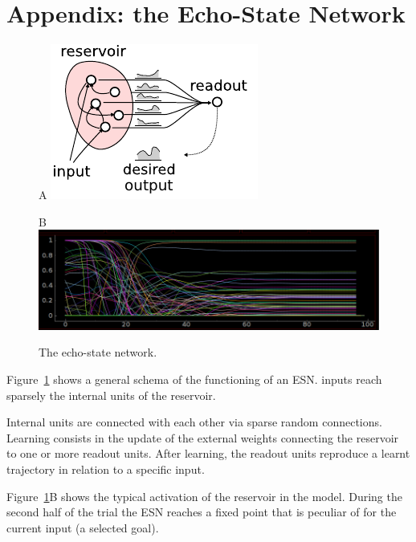 \documentclass[11pt]{article}
\begin{document}
\section{Appendix: the Echo-State Network}
%
\begin{figure}[H] 
 
    \centering 

    A \includegraphics[width=.6\textwidth]{reservoir} 
    
    B \includegraphics[width=.6\textwidth]{ESN} 

    \caption{ The echo-state network.  }
    
    \label{fig:esn}

\end{figure}

Figure~\ref{fig:esn} shows a general schema of the
functioning of an ESN. inputs reach sparsely the internal
units of the reservoir. 

Internal units are connected with each other via sparse
random connections. Learning consists in the update of the
external weights connecting the reservoir to one or more
readout units. After learning, the readout units reproduce a
learnt trajectory in relation to a specific input. 

Figure~\ref{fig:esn}B shows the typical activation of the
reservoir in the model. During the second half of the trial
the ESN reaches a fixed point that is peculiar of for the
current input (a selected goal).

%
\end{document}
